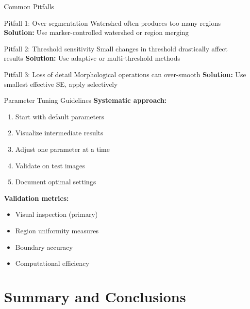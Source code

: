 \documentclass[aspectratio=169,10pt]{beamer}
\begin{document}
\begin{frame}{Common Pitfalls}
\begin{alertblock}{Pitfall 1: Over-segmentation}
Watershed often produces too many regions
\textbf{Solution:} Use marker-controlled watershed or region merging
\end{alertblock}

\begin{alertblock}{Pitfall 2: Threshold sensitivity}
Small changes in threshold drastically affect results
\textbf{Solution:} Use adaptive or multi-threshold methods
\end{alertblock}

\begin{alertblock}{Pitfall 3: Loss of detail}
Morphological operations can over-smooth
\textbf{Solution:} Use smallest effective SE, apply selectively
\end{alertblock}
\end{frame}

\begin{frame}{Parameter Tuning Guidelines}
\textbf{Systematic approach:}
\begin{enumerate}
\item Start with default parameters
\item Visualize intermediate results
\item Adjust one parameter at a time
\item Validate on test images
\item Document optimal settings
\end{enumerate}

\textbf{Validation metrics:}
\begin{itemize}
\item Visual inspection (primary)
\item Region uniformity measures
\item Boundary accuracy
\item Computational efficiency
\end{itemize}
\end{frame}

\section{Summary and Conclusions}
\end{document}
